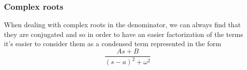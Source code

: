 	\subsubsection*{Complex roots} When dealing with complex roots in the denominator, we can always find that they are conjugated and so in order to have an easier factorization of the terms it's easier to consider them as a condensed term represented in the form
	\[ \frac{As+B}{(s-a)^2+\omega^2} \]
	
	